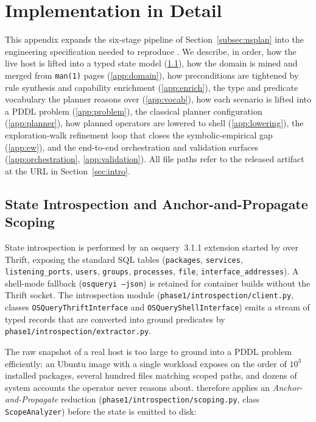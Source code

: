 \appendix
\section{\nsplan Implementation in Detail}
\label{app:nsplan}

This appendix expands the six-stage pipeline of Section~\ref{subsec:nsplan} into the engineering specification needed to reproduce \nsplan. We describe, in order, how the live host is lifted into a typed state model (\ref{app:introspection}), how the domain is mined and merged from \texttt{man(1)} pages (\ref{app:domain}), how preconditions are tightened by rule synthesis and capability enrichment (\ref{app:enrich}), the type and predicate vocabulary the planner reasons over (\ref{app:vocab}), how each scenario is lifted into a PDDL problem (\ref{app:problem}), the classical planner configuration (\ref{app:planner}), how planned operators are lowered to shell (\ref{app:lowering}), the exploration-walk refinement loop that closes the symbolic-empirical gap (\ref{app:ew}), and the end-to-end orchestration and validation surfaces (\ref{app:orchestration}, \ref{app:validation}). All file paths refer to the released artifact at the URL in Section~\ref{sec:intro}.

\subsection{State Introspection and Anchor-and-Propagate Scoping}
\label{app:introspection}

State introspection is performed by an osquery~3.1.1 extension started by \nsplan over Thrift, exposing the standard SQL tables (\texttt{packages}, \texttt{services}, \texttt{listening\_ports}, \texttt{users}, \texttt{groups}, \texttt{processes}, \texttt{file}, \texttt{interface\_addresses}). A shell-mode fallback (\texttt{osqueryi --json}) is retained for container builds without the Thrift socket. The introspection module (\texttt{phase1/introspection/client.py}, classes \texttt{OSQueryThriftInterface} and \texttt{OSQueryShellInterface}) emits a stream of typed records that are converted into ground predicates by \texttt{phase1/introspection/extractor.py}.

The raw snapshot of a real host is too large to ground into a PDDL problem efficiently: an Ubuntu image with a single workload exposes on the order of $10^3$ installed packages, several hundred files matching scoped paths, and dozens of system accounts the operator never reasons about. \nsplan therefore applies an \emph{Anchor-and-Propagate} reduction (\texttt{phase1/introspection/scoping.py}, class \texttt{ScopeAnalyzer}) before the state is emitted to disk:

